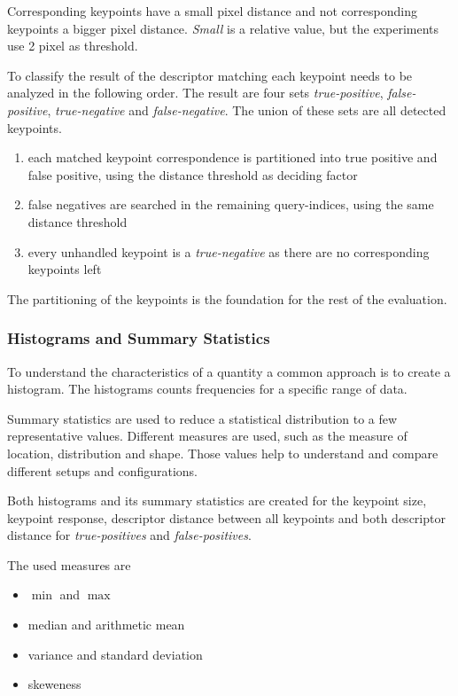 
Corresponding keypoints have a small pixel distance and not corresponding keypoints a bigger pixel distance.
\emph{Small} is a relative value, but the experiments use 2 pixel as threshold.

To classify the result of the descriptor matching each keypoint needs to be analyzed in the following order.
The result are four sets \emph{true-positive}, \emph{false-positive}, \emph{true-negative} and \emph{false-negative}.
The union of these sets are all detected keypoints.

\begin{enumerate}
    \item each matched keypoint correspondence is partitioned into true positive and false positive, using the distance threshold as deciding factor
    \item false negatives are searched in the remaining query-indices, using the same distance threshold
    \item every unhandled keypoint is a \emph{true-negative} as there are no corresponding keypoints left
\end{enumerate}

The partitioning of the keypoints is the foundation for the rest of the evaluation.

\subsubsection{Histograms and Summary Statistics}

To understand the characteristics of a quantity a common approach is to create a histogram.
The histograms counts frequencies for a specific range of data.

Summary statistics are used to reduce a statistical distribution to a few representative values.
Different measures are used, such as the measure of location, distribution and shape.
Those values help to understand and compare different setups and configurations.

Both histograms and its summary statistics are created for the keypoint size, keypoint response, descriptor distance between all keypoints and both descriptor distance for \emph{true-positives} and \emph{false-positives}.

The used measures are
\begin{itemize}
    \item $\min$ and $\max$
    \item median and arithmetic mean
    \item variance and standard deviation
    \item skeweness
\end{itemize}

